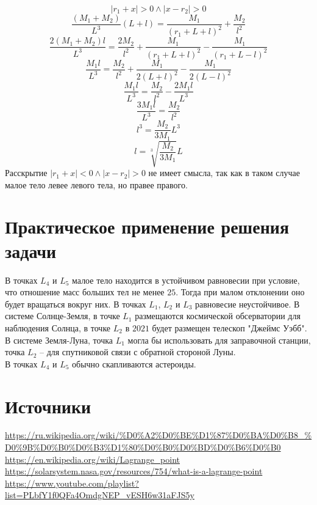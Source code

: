 \documentclass{article}
\begin{document}
    \[ |r_1 + x| > 0 \land |x - r_2| > 0 \]
    \[ \frac{\left( M_1 + M_2 \right) }{L^3} (L + l) =
       \frac{M_1}{(r_1 + L + l)^2} + \frac{M_2}{l^2} \]
    \[ \frac{2 \left( M_1 + M_2 \right) l}{L^3} = \frac{2M_2}{l^2} + \frac{M_1}{(r_1 + L + l)^2} - \frac{M_1}{(r_1 + L - l)^2} \]
    \[ \frac{M_1 l}{L^3} = \frac{M_2}{l^2} + \frac{M_1}{2(L + l)^2} - \frac{M_1}{2(L - l)^2} \]
    \[ \frac{M_1 l}{L^3} = \frac{M_2}{l^2} - \frac{2 M_1 l}{L^3} \]
    \[ \frac{3 M_1 l}{L^3} = \frac{M_2}{l^2} \]
    \[ l^3 = \frac{M_2}{3 M_1} L^3 \]
    \[ l = \sqrt[3]{\frac{M_2}{3 M_1}} L \]
    Расскрытие $|r_1 + x| < 0 \land |x - r_2| > 0$ не имеет смысла, так как в таком случае малое тело левее левого тела, но правее правого.

    \section*{Практическое применение решения задачи}
    В точках $L_4$ и $L_5$ малое тело находится в устойчивом равновесии при условие, что отношение масс больших тел не менее $25$.
    Тогда при малом отклонении оно будет вращаться вокруг них. В точках $L_1$, $L_2$ и $L_3$ равновесие неустойчивое.
    В системе Солнце-Земля, в точке $L_1$ размещаются космической обсерватории для наблюдения Солнца, в точке $L_2$ в $2021$ будет размещен телескоп "Джеймс Уэбб".
    \\
    В системе Земля-Луна, точка $L_1$ могла бы использовать для заправочной станции, точка $L_2$ -- для спутниковой связи с обратной стороной Луны.
    \\
    В точках $L_4$ и $L_5$ обычно скапливаются астероиды.
    
    \section*{Источники}
    \url{https://ru.wikipedia.org/wiki/%D0%A2%D0%BE%D1%87%D0%BA%D0%B8_%D0%9B%D0%B0%D0%B3%D1%80%D0%B0%D0%BD%D0%B6%D0%B0}
    \\
    \url{https://en.wikipedia.org/wiki/Lagrange_point}
    \\
    \url{https://solarsystem.nasa.gov/resources/754/what-is-a-lagrange-point}
    \\
    \url{https://www.youtube.com/playlist?list=PLbfY1f0QFa4OmdgNEP_vESH6w31aFJS5y}
    \\
\end{document}
